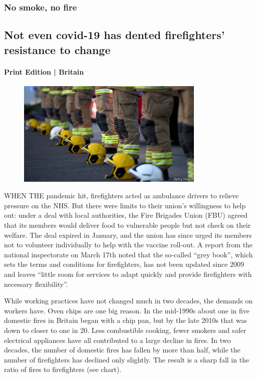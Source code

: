 \documentclass{article}
\begin{document}
\subsubsection{No smoke, no fire }
\subsection{Not even covid-19 has dented firefighters' resistance to change }
\paragraph{Print Edition | Britain  \quad \color{gray}{Mar 27th 2021 }}
\begin{figure}[h]
\centering
\includegraphics[width=0.8\textwidth]{images/20210327_brp505.jpg}
\end{figure}
\lettrine{W}HEN THE pandemic hit, firefighters acted as ambulance drivers to relieve pressure on the NHS. But there were limits to their union's willingness to help out: under a deal with local authorities, the Fire Brigades Union (FBU) agreed that its members would deliver food to vulnerable people but not check on their welfare. The deal expired in January, and the union has since urged its members not to volunteer individually to help with the vaccine roll-out. A report from the national inspectorate on March 17th noted that the so-called ``grey book'', which sets the terms and conditions for firefighters, has not been updated since 2009 and leaves ``little room for services to adapt quickly and provide firefighters with necessary flexibility''. 

While working practices have not changed much in two decades, the demands on workers have. Oven chips are one big reason. In the mid-1990s about one in five domestic fires in Britain began with a chip pan, but by the late 2010s that was down to closer to one in 20. Less combustible cooking, fewer smokers and safer electrical appliances have all contributed to a large decline in fires. In two decades, the number of domestic fires has fallen by more than half, while the number of firefighters has declined only slightly. The result is a sharp fall in the ratio of fires to firefighters (see chart). 
\end{document}
